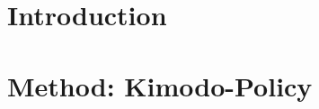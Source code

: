 \documentclass[11pt,a4paper]{article}%
\begin{document}
\maketitleHCL



\section{Introduction}
\label{sec:introduction}




\section{Method: Kimodo-Policy}
\label{sec:method}










\end{document}

